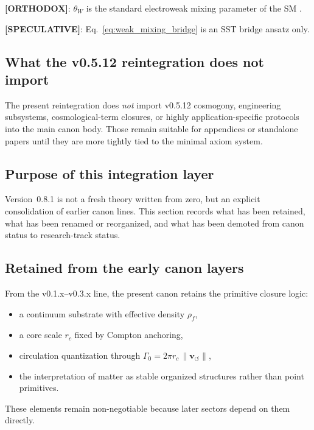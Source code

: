 \documentclass[11pt]{article}
\theoremstyle{definition}
\theoremstyle{plain}
\theoremstyle{remark}
\newcommand{\rhoF}{{\rho_{\!f}}}
\newcommand{\rc}{{r_c}}
\newcommand{\vnorm}{\lVert \mathbf{v}_{\!\boldsymbol{\circlearrowleft}} \rVert}
\begin{document}
        \textbf{[ORTHODOX]}: $\theta_W$ is the standard electroweak mixing parameter of the SM \cite{Weinberg1967,PDG2024}.

        \textbf{[SPECULATIVE]}: Eq.~\eqref{eq:weak_mixing_bridge} is an SST bridge ansatz only.

    \subsection{What the v0.5.12 reintegration does not import}

        The present reintegration does \emph{not} import v0.5.12 cosmogony, engineering subsystems, cosmological-term closures, or highly application-specific protocols into the main canon body. Those remain suitable for appendices or standalone papers until they are more tightly tied to the minimal axiom system.

    \subsection{Purpose of this integration layer}
        Version~0.8.1 is not a fresh theory written from zero, but an explicit consolidation of earlier canon lines. This section records what has been retained, what has been renamed or reorganized, and what has been demoted from canon status to research-track status.

    \subsection{Retained from the early canon layers}
        From the v0.1.x--v0.3.x line, the present canon retains the primitive closure logic:
        \begin{itemize}
            \item a continuum substrate with effective density $\rhoF$,
            \item a core scale $r_c$ fixed by Compton anchoring,
            \item circulation quantization through $\Gamma_0 = 2\pi \rc \, \vnorm$,
            \item the interpretation of matter as stable organized structures rather than point primitives.
        \end{itemize}
        These elements remain non-negotiable because later sectors depend on them directly.
\end{document}
